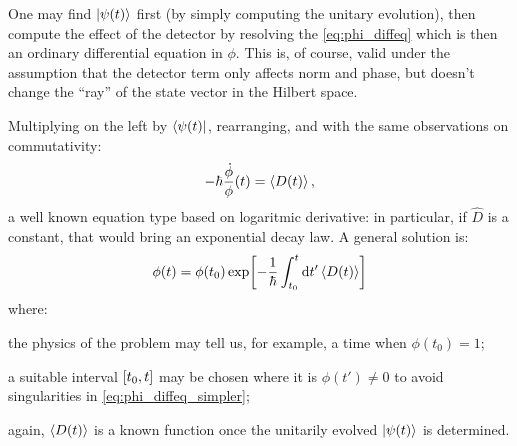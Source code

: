 One may find $\ket{\psi(t)}$ first (by simply computing the unitary evolution),
then compute the effect of the detector by resolving the \eqref{eq:phi_diffeq}
which is then an ordinary differential equation in $\phi$. This is, of course, valid
under the assumption that the detector term only affects norm and phase,
but doesn't change the ``ray'' of the state vector in the Hilbert space. 

Multiplying on the left by $\bra{\psi(t)}$, rearranging, and with the same observations
on commutativity:
\begin{equation}\label{eq:phi_diffeq_simpler}
  -\hbar\frac{\dot{\phi}}{\phi}(t) = \ev{D(t)} \text{,}
\end{equation}
a well known equation type based on logaritmic derivative: in particular,
if $\hat{D}$ is a constant, that would bring an exponential decay law.
A general solution is:
\begin{equation}
  \phi(t) = \phi(t_0) \exp[ -\frac{1}{\hbar} \int_{t_0}^{t} \dd{t'} \ev{D(t)} ]
\end{equation}
where:
\begin{enumerate*}[label=\emph{\alph*})]
  \item
    the physics of the problem may tell us, for example, a time when $\phi(t_0) = 1$;
  \item
    a suitable interval $\qty[t_0, t]$ may be chosen where it is $\phi(t') \ne 0$
    to avoid singularities in \eqref{eq:phi_diffeq_simpler};
  \item
    again, $\ev{D(t)}$ is a known function
    once the unitarily evolved $\ket{\psi(t)}$ is determined.
\end{enumerate*}


   
